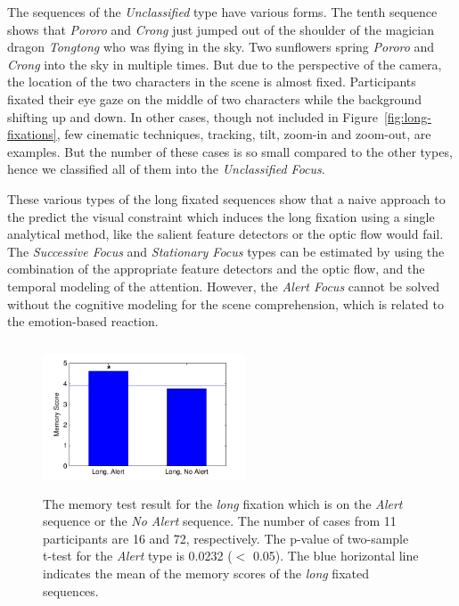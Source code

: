 \documentclass[10pt,letterpaper]{article}
\begin{document}
The sequences of the \textit{Unclassified} type have various forms. The tenth sequence shows that \textit{Pororo} and \textit{Crong} just jumped out of the shoulder of the magician dragon \textit{Tongtong} who was flying in the sky. Two sunflowers spring \textit{Pororo} and \textit{Crong} into the sky in multiple times. But due to the perspective of the camera, the location of the two characters in the scene is almost fixed. Participants fixated their eye gaze on the middle of two characters while the background shifting up and down. In other cases, though not included in Figure~\ref{fig:long-fixations}, few cinematic techniques, tracking, tilt, zoom-in and zoom-out, are examples. But the number of these cases is so small compared to the other types, hence we classified all of them into the \textit{Unclassified Focus}.

These various types of the long fixated sequences show that a naive approach to the predict the visual constraint which induces the long fixation using a single analytical method, like the salient feature detectors \cite{marr1980,canny1986} or the optic flow \cite{koenderink1986} would fail. The \textit{Successive Focus} and \textit{Stationary Focus} types can be estimated by using the combination of the appropriate feature detectors and the optic flow, and the temporal modeling of the attention. However, the \textit{Alert Focus} cannot be solved without the cognitive modeling for the scene comprehension, which is related to the emotion-based reaction. 

\begin{figure}
  \centerline{\includegraphics[width=60mm,height=44mm,trim=9mm 3mm 12mm 3mm]{./eps/memtest_long.pdf}}
  \caption{The memory test result for the \textit{long} fixation which is on the \textit{Alert} sequence or the \textit{No Alert} sequence. The number of cases from 11 participants are 16 and 72, respectively. The p-value of two-sample t-test for the \textit{Alert} type is 0.0232 ($<$ 0.05). The blue horizontal line indicates the mean of the memory scores of the \textit{long} fixated sequences.}
  \label{fig:memtest-long}
\end{figure}
\end{document}
